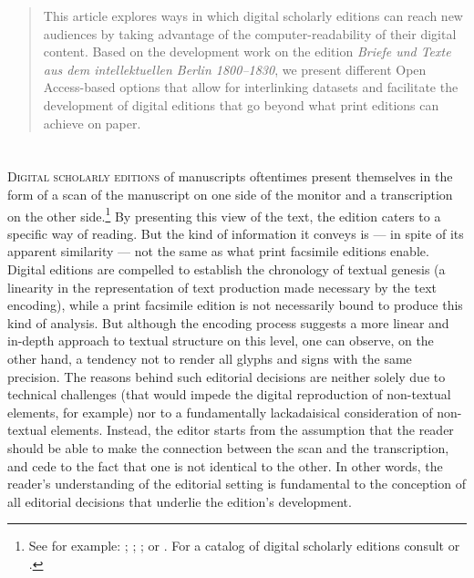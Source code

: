 

\begin{paper}
\begin{abstract}
This article explores ways in which digital scholarly editions
can reach new audiences by taking advantage of the
computer-readability of their digital content. Based on the development work on the edition \emph{Briefe und Texte aus dem intellektuellen Berlin 1800--1830}, we present different Open Access-based options that allow for interlinking datasets and facilitate the development of digital editions that go beyond what print editions can achieve on paper.
\end{abstract}

\section*{}
\textsc{Digital scholarly editions} of manuscripts oftentimes present themselves in the form of a scan of the manuscript on one side of the monitor and a transcription on the other side.\footnote{See for example: \citealt{van_gogh_vincent_2009}; \citealt{schlegel_august_2014}; \citealt{ghelardi_burckhardtsource_2019}; or \citealt{jung_digitale_2015}. For a catalog of digital scholarly editions consult \citealt{sahle_catalog_2008}
  or \citealt{franzini_catalogue_2016}.} By presenting this view of the text, the edition caters to
a specific way of reading. But the kind of information it conveys is
--- in spite of its apparent similarity --- not the same as what print
facsimile editions enable. Digital editions are compelled to establish
the chronology of textual genesis (a linearity in the representation of
text production made necessary by the text encoding), while a print
facsimile edition is not necessarily bound to produce this kind of
analysis. But although the encoding process suggests a more linear and
in-depth approach to textual structure on this level, one can observe, on
the other hand, a tendency not to render
all glyphs and signs with the same precision. The reasons behind such editorial decisions are neither solely due to
technical challenges (that would impede the digital reproduction of non-textual elements, for example)
nor to a fundamentally lackadaisical consideration of non-textual
elements. Instead, the editor starts from the assumption
that the reader should be able to make the connection between the
scan and the transcription, and cede to the fact that
one is not identical to the other. In other words, the reader's
understanding of the editorial setting is fundamental to the conception of all editorial
decisions that underlie the edition's development.


\end{paper}
